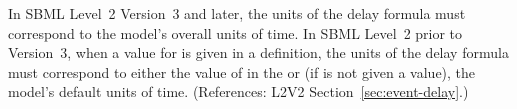 In SBML Level~2 Version~3 and later, the units of the \Event delay formula
must correspond to the model's overall units of time.  In SBML Level~2
prior to Version~3, when a value for  is given in a \Event
definition, the units of the delay formula must correspond to either the
value of  in the \Event or (if  is not
given a value), the model's default units of time.  (References: L2V2
Section~\ref{sec:event-delay}.)
